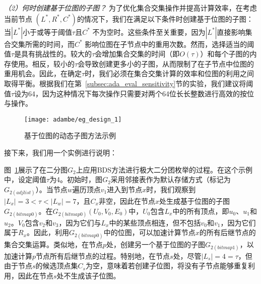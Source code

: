 \textit{（2）何时创建基于位图的子图？ }为了优化集合交集操作并提高计算效率，在考虑当前节点 $(L^*, R^*, C^*)$的情况下，我们在满足以下条件时创建基于位图的子图：当$|L^*|$小于或等于阈值$\tau$且$C^*$ 不为空时。这些条件至关重要，因为$|L^*|$直接影响集合交集所需的时间，而$C^*$ 影响位图在子节点中的重用次数。然而，选择适当的阈值$\tau$是具有挑战性的。较大的$\tau$会增加集合交集的时间（即$O(\tau)$）和每个子图的内存使用。相反，较小的$\tau$会导致创建更多小的子图，从而限制了在子节点中位图的重用机会。因此，在确定$\tau$时，我们必须在集合交集计算的效率和位图的利用之间取得平衡。根据我们在第~\ref{subsec:ada_eval_sensitivity}节的实验，我们建议将阈值$\tau$设为64，因为这种情况下每次操作只需要对两个64位长长整数进行高效的按位与操作。



\begin{figure} [H]
	\centering
	\texttt{[image: adambe/eg\_design\_1]}
	\caption{基于位图的动态子图方法示例}

	\label{fig:ada_design1}
\end{figure}


接下来，我们用一个实例进行说明：

\begin{example}
	
	图~\ref{fig:ada_design1}展示了在二分图$G_2$上应用BDS方法进行极大二分团枚举的过程。在这个示例中，设定阈值$\tau$为4。初始时，图$G_2$采用邻接表作为默认存储方式（标记为$G_{2 (adjlist)}$）。当节点$w$遍历顶点$v_1$进入到节点$x$时，我们观察到$|L_x| = 3 < \tau < |L_w| = 7$，且$C_x$非空，因此在节点$x$处生成基于位图的子图$G_{2 (bitmap0)}$。在$G_{2 (bitmap0)}(U_0, V_0, E_0)$中，$U_0$包含$L_x$中的所有顶点，即$u_0$、$u_1$和$u_2$。$V_0$包含$v_2$和$v_3$，因为它们与$L_x$中的某些顶点相连，但不包括$v_0$和$v_1$，因为它们属于$R_x$。因此，利用$G_{2 (bitmap0)}$中的位图，可以加速计算节点$x$的所有后继节点的集合交集运算。类似地，在节点$p$处，创建另一个基于位图的子图$G_{2 (bitmap1)}$，以加速计算$p$节点所有后继节点的过程。特别地，在节点$s$处，尽管$|L_s| = 4 = \tau$，但由于节点$s$的候选顶点集$C_s$为空，意味着若创建子位图，将没有子节点能够重复利用，因此在节点$s$处不生成该子位图。
  
\end{example}

